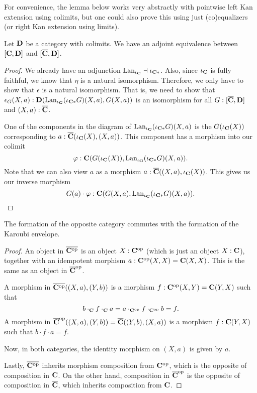 For convenience, the lemma below works very abstractly with pointwise left Kan extension using colimits, but one could also prove this using just (co)equalizers (or right Kan extension using limits).
\begin{lemma}
  Let $ \mathbf{D} $ be a category with colimits. We have an adjoint equivalence between $ [\mathbf{C}, \mathbf{D}] $ and $ [\overline {\mathbf{C}}, \mathbf{D}] $.
\end{lemma}
\begin{proof}
  We already have an adjunction $ \text{Lan}_{\iota_{\mathbf{C}}} \dashv \iota_{\mathbf{C}*} $. Also, since $ \iota_{\mathbf{C}} $ is fully faithful, we know that $ \eta $ is a natural isomorphism. Therefore, we only have to show that $ \epsilon $ is a natural isomorphism. That is, we need to show that $ \epsilon_G(X, a): \mathbf{D}(\text{Lan}_{\iota_{\mathbf{C}}}(\iota_{\mathbf{C}*} G) (X, a), G(X, a)) $ is an isomorphism for all $ G: [\overline {\mathbf{C}}, \mathbf{D}] $ and $ (X, a): \overline {\mathbf{C}} $.

  One of the components in the diagram of $ \text{Lan}_{\iota_{\mathbf{C}}}(\iota_{\mathbf{C}*} G) (X, a) $ is the $ G(\iota_{\mathbf{C}}(X)) $ corresponding to $ a: \overline {\mathbf{C}}(\iota_{\mathbf{C}}(X), (X, a)) $. This component has a morphism into our colimit
  \[ \varphi: \mathbf{C}(G(\iota_{\mathbf{C}}(X)), \text{Lan}_{\iota_{\mathbf{C}}}(\iota_{\mathbf{C}*} G) (X, a)). \]
  Note that we can also view $ a $ as a morphism $ a: \overline {\mathbf{C}}((X, a), \iota_{\mathbf{C}}(X)) $. This gives us our inverse morphism
  \[ G(a) \cdot \varphi: \mathbf{C}(G(X, a), \text{Lan}_{\iota_{\mathbf{C}}}(\iota_{\mathbf{C}*} G) (X, a)). \]
\end{proof}

\begin{lemma}
  The formation of the opposite category commutes with the formation of the Karoubi envelope.
\end{lemma}
\begin{proof}
  An object in $ \overline{\mathbf{C}^{\text{op}}} $ is an object $ X: \mathbf{C}^{\text{op}} $ (which is just an object $ X: \mathbf{C} $), together with an idempotent morphism $ a: \mathbf{C}^{\text{op}}(X, X) = \mathbf{C}(X, X) $. This is the same as an object in $ \overline {\mathbf{C}}^{\text{op}} $.

  A morphism in $ \overline{\mathbf{C}^{\text{op}}}((X, a), (Y, b)) $ is a morphism $ f: \mathbf{C}^{\text{op}}(X, Y) = \mathbf{C}(Y, X) $ such that
  \[ b \cdot_{\mathbf{C}} f \cdot_{\mathbf{C}} a = a \cdot_{\mathbf{C}^{\text{op}}} f \cdot_{\mathbf{C}^{\text{op}}} b = f. \]
  A morphism in $ \overline {\mathbf{C}}^{\text{op}}((X, a), (Y, b)) = \overline {\mathbf{C}}((Y, b), (X, a)) $ is a morphism $ f: \mathbf{C}(Y, X) $ such that $ b \cdot f \cdot a = f $.

  Now, in both categories, the identity morphism on $ (X, a) $ is given by $ a $.

  Lastly, $ \overline {\mathbf{C}^{\text{op}}} $ inherits morphism composition from $ \mathbf{C}^{\text{op}} $, which is the opposite of composition in $ \mathbf{C} $. On the other hand, composition in $ \overline {\mathbf{C}}^{\text{op}} $ is the opposite of composition in $ \overline {\mathbf{C}} $, which inherits composition from $ \mathbf{C} $.
\end{proof}

